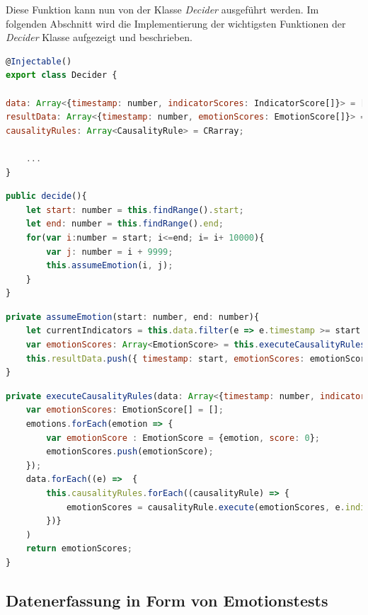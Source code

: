 Diese Funktion kann nun von der Klasse \textit{Decider} ausgeführt werden.
\newline \newline
Im folgenden Abschnitt wird die Implementierung der wichtigsten Funktionen der \textit{Decider} Klasse aufgezeigt und beschrieben. \newpage
\begin{lstlisting}[caption={Atrribute der Decider-Klasse}, language=JavaScript]
@Injectable()
export class Decider {

data: Array<{timestamp: number, indicatorScores: IndicatorScore[]}> = [];
resultData: Array<{timestamp: number, emotionScores: EmotionScore[]}> = [];
causalityRules: Array<CausalityRule> = CRarray;

	...
}
\end{lstlisting}
\begin{lstlisting}[caption={decide-Funktion der Decider-Klasse}, language=JavaScript]
public decide(){
	let start: number = this.findRange().start;
	let end: number = this.findRange().end;
	for(var i:number = start; i<=end; i= i+ 10000){
		var j: number = i + 9999;
		this.assumeEmotion(i, j);
	} 
}
\end{lstlisting}
\begin{lstlisting}[caption={assumeEmotion-Funktion der Decider-Klasse}, language=JavaScript]
private assumeEmotion(start: number, end: number){
	let currentIndicators = this.data.filter(e => e.timestamp >= start && e.timestamp <= end)
	var emotionScores: Array<EmotionScore> = this.executeCausalityRules(currentIndicators);
	this.resultData.push({ timestamp: start, emotionScores: emotionScores});
}
\end{lstlisting}
\begin{lstlisting}[caption={executeCausalityRules-Funktion der Decider-Klasse}, language=JavaScript]
private executeCausalityRules(data: Array<{timestamp: number, indicatorScores: IndicatorScore[]}>){   
	var emotionScores: EmotionScore[] = [];
	emotions.forEach(emotion => {
		var emotionScore : EmotionScore = {emotion, score: 0};
		emotionScores.push(emotionScore);
	});
	data.forEach((e) =>  { 
		this.causalityRules.forEach((causalityRule) => {
			emotionScores = causalityRule.execute(emotionScores, e.indicatorScores)  ;
		})}
	)
	return emotionScores;
}
\end{lstlisting}
\subsection{Datenerfassung in Form von Emotionstests}
